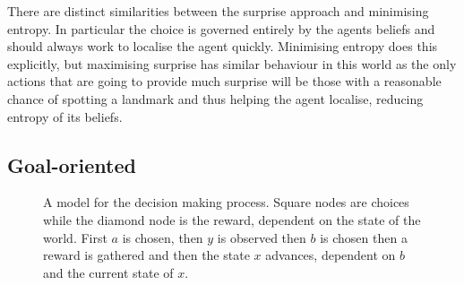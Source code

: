 \documentclass{article}
\begin{document}
There are distinct similarities between the surprise approach and minimising entropy.
In particular the choice is governed entirely by the agents beliefs and should always
work to localise the agent quickly. Minimising entropy does this explicitly, but 
maximising surprise has similar behaviour in this world as the only actions that are going
to provide much surprise will be those with a reasonable chance of spotting a landmark
and thus helping the agent localise, reducing entropy of its beliefs.

\subsection{Goal-oriented}
\begin{figure}
\centering
\caption{A model for the decision making process. Square nodes are choices while the 
diamond node is the reward, dependent on the state of the world. First \(a\) is chosen,
then \(y\) is observed then \(b\) is chosen then a reward is gathered and then the state
\(x\) advances, dependent on \(b\) and the current state of \(x\).}
\label{fig:ddn}
\end{figure}
\end{document}

